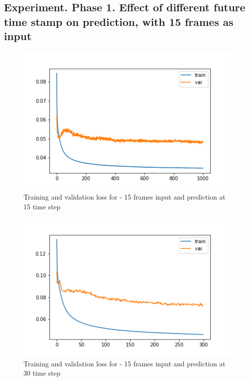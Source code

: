 \subsection{Experiment. Phase 1. Effect of different future time stamp on prediction, with 15 frames as input}
\begin{figure}[H] 
\includegraphics[scale=0.75]{conf7_1000e_15ffuture}
\begin{center}
\caption{Training and validation loss for - 15 frames input and prediction at 15 time step }
\label{fig:15-15}
\end{center}
\end{figure}

\begin{figure}[H] 
\includegraphics[scale=0.75]{conf8_300e_30ffuture}
\begin{center}
\caption{Training and validation loss for - 15 frames input and prediction at 30 time step }
\label{fig:15-30}
\end{center}
\end{figure}

